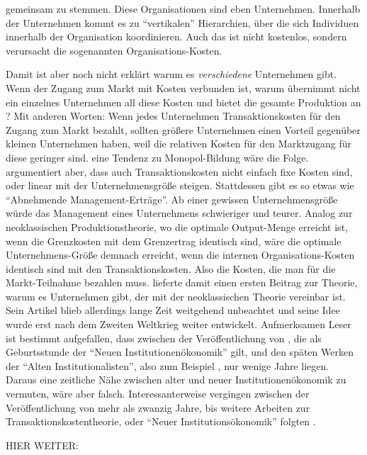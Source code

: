 gemeinsam zu stemmen. Diese Organisationen sind eben Unternehmen. Innerhalb der Unternehmen kommt es zu "`vertikalen"' \parencite[S. 388]{Coase1937} Hierarchien, über die sich Individuen innerhalb der Organisation koordinieren. Auch das ist nicht kostenlos, sondern verursacht die sogenannten Organisations-Kosten.


Damit ist aber noch nicht erklärt warum es \textit{verschiedene} Unternehmen gibt. Wenn der Zugang zum Markt mit Kosten verbunden ist, warum übernimmt nicht ein einzelnes Unternehmen all diese Kosten und bietet die gesamte Produktion an \parencite[S. 394]{Coase1937}? Mit anderen Worten: Wenn jedes Unternehmen Transaktionskosten für den Zugang zum Markt bezahlt, sollten größere Unternehmen einen Vorteil gegenüber kleinen Unternehmen haben, weil die relativen Kosten für den Marktzugang für diese geringer sind. eine Tendenz zu Monopol-Bildung wäre die Folge. \textcite[S. 395]{Coase1937} argumentiert aber, dass auch Transaktionskosten nicht einfach fixe Kosten sind, oder linear mit der Unternehmensgröße steigen. Stattdessen gibt es so etwas wie "`Abnehmende Management-Erträge"'. Ab einer gewissen Unternehmensgröße würde das Management eines Unternehmens schwieriger und teurer. Analog zur neoklassischen Produktionstheorie, wo die optimale Output-Menge erreicht ist, wenn die Grenzkosten mit dem Grenzertrag identisch sind, wäre die optimale Unternehmens-Größe demnach erreicht, wenn die internen Organisations-Kosten identisch sind mit den Transaktionskosten. Also die Kosten, die man für die Markt-Teilnahme bezahlen muss. \textcite{Coase1937} lieferte damit einen ersten Beitrag zur Theorie, warum es Unternehmen gibt, der mit der neoklassischen Theorie vereinbar ist. Sein Artikel blieb allerdings lange Zeit weitgehend unbeachtet \parencite{Coase1991a} und seine Idee wurde erst nach dem Zweiten Weltkrieg weiter entwickelt. Aufmerksamen Leser ist bestimmt aufgefallen, dass zwischen der Veröffentlichung von \textcite{Coase1937}, die als Geburtsstunde der "`Neuen Institutionenökonomik"' gilt, und den späten Werken der "`Alten Institutionalisten"', also zum Beispiel \textcite{Commons1934}, nur wenige Jahre liegen. Daraus eine zeitliche Nähe zwischen alter und neuer Institutionenökonomik zu vermuten, wäre aber falsch. Interessanterweise vergingen zwischen der Veröffentlichung von \textcite{Coase1937} mehr als zwanzig Jahre, bis weitere Arbeiten zur Transaktionskostentheorie, oder "`Neuer Institutionsökonomik"' folgten \parencite[S. 148]{Blaug2001}.

HIER WEITER:


